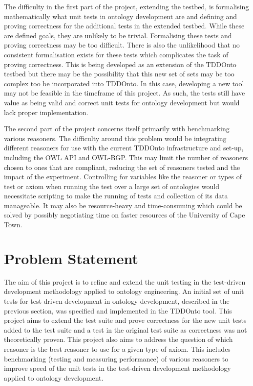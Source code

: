\documentclass[draft]{sig-alternate}
\begin{document}
The difficulty in the first part of the project, extending the testbed, is formalising mathematically what unit tests in ontology development are and defining and proving correctness for the additional tests in the extended testbed. While these are defined goals, they are unlikely to be trivial. Formalising these tests and proving correctness may be too difficult. There is also the unlikelihood that no consistent formalisation exists for these tests which complicates the task of proving correctness. This is being developed as an extension of the TDDOnto testbed but there may be the possibility that this new set of sets may be too complex too be incorporated into TDDOnto. In this case, developing a new tool may not be feasible in the timeframe of this project. As such, the tests still have value as being valid and correct unit tests for ontology development but would lack proper implementation.

The second part of the project concerns itself primarily with benchmarking various reasoners. The difficulty around this problem would be integrating different reasoners for use with the current TDDOnto infrastructure and set-up, including the OWL API and OWL-BGP. This may limit the number of reasoners chosen to ones that are compliant, reducing the set of reasoners tested and the impact of the experiment. Controlling for variables like the reasoner or types of test or axiom when running the test over a large set of ontologies would necessitate scripting to make the running of tests and collection of its data manageable. It may also be resource-heavy and time-consuming which could be solved by possibly negotiating time on faster resources of the University of Cape Town.

\section{Problem Statement}

The aim of this project is to refine and extend the unit testing in the test-driven development methodology applied to ontology engineering. An initial set of unit tests for test-driven development in ontology development, described in the previous section, was specified and implemented in the TDDOnto tool. This project aims to extend the test suite and prove correctness for the new unit tests added to the test suite and a test in the original test suite as correctness was not theoretically proven. This project also aims to address the question of which reasoner is the best reasoner to use for a given type of axiom. This includes benchmarking (testing and measuring performance) of various reasoners to improve speed of the unit tests in the test-driven development methodology applied to ontology development.
\end{document}
